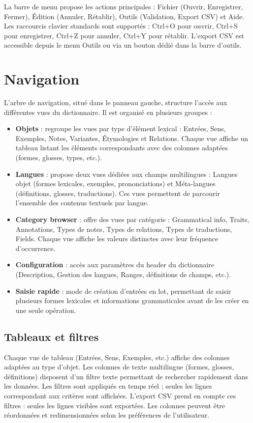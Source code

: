 \documentclass[11pt,twoside,openany]{book}
\begin{document}
La barre de menu propose les actions principales : Fichier (Ouvrir, Enregistrer, Fermer), Édition (Annuler, Rétablir), Outils (Validation, Export CSV) et Aide. Les raccourcis clavier standards sont supportés : Ctrl+O pour ouvrir, Ctrl+S pour enregistrer, Ctrl+Z pour annuler, Ctrl+Y pour rétablir. L'export CSV est accessible depuis le menu Outils ou via un bouton dédié dans la barre d'outils.

\section{Navigation}

L'arbre de navigation, situé dans le panneau gauche, structure l'accès aux différentes vues du dictionnaire. Il est organisé en plusieurs groupes :

\begin{itemize}
\item \textbf{Objets} : regroupe les vues par type d'élément lexical : Entrées, Sens, Exemples, Notes, Variantes, Étymologies et Relations. Chaque vue affiche un tableau listant les éléments correspondants avec des colonnes adaptées (formes, glosses, types, etc.).
\item \textbf{Langues} : propose deux vues dédiées aux champs multilingues : Langues objet (formes lexicales, exemples, prononciations) et Méta-langues (définitions, glosses, traductions). Ces vues permettent de parcourir l'ensemble des contenus textuels par langue.
\item \textbf{Category browser} : offre des vues par catégorie : Grammatical info, Traits, Annotations, Types de notes, Types de relations, Types de traductions, Fields. Chaque vue affiche les valeurs distinctes avec leur fréquence d'occurrence.
\item \textbf{Configuration} : accès aux paramètres du header du dictionnaire (Description, Gestion des langues, Ranges, définitions de champs, etc.).
\item \textbf{Saisie rapide} : mode de création d'entrées en lot, permettant de saisir plusieurs formes lexicales et informations grammaticales avant de les créer en une seule opération.
\end{itemize}

\subsection{Tableaux et filtres}

Chaque vue de tableau (Entrées, Sens, Exemples, etc.) affiche des colonnes adaptées au type d'objet. Les colonnes de texte multilingue (formes, glosses, définitions) disposent d'un filtre texte permettant de rechercher rapidement dans les données. Les filtres sont appliqués en temps réel ; seules les lignes correspondant aux critères sont affichées. L'export CSV prend en compte ces filtres : seules les lignes visibles sont exportées. Les colonnes peuvent être réordonnées et redimensionnées selon les préférences de l'utilisateur.
\end{document}
